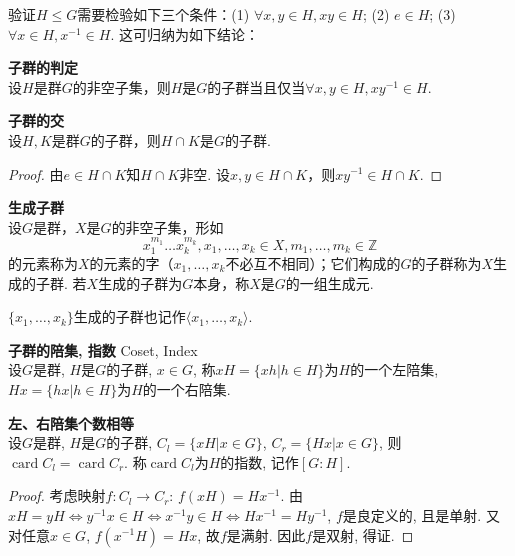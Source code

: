 验证$H\le G$需要检验如下三个条件：(1) $\forall x,y\in H, xy \in H$; (2) $e\in H$; (3) $\forall x\in H, x^{-1} \in H$. 这可归纳为如下结论：

\begin{pro}
\textbf{子群的判定}\\
设$H$是群$G$的非空子集，则$H$是$G$的子群当且仅当$\forall x,y \in H, xy^{-1} \in H$.
\end{pro}

\begin{pro}
\textbf{子群的交}\\
设$H, K$是群$G$的子群，则$H\cap K$是$G$的子群.
\end{pro}
\begin{proof}
    由$e\in H\cap K$知$H\cap K$非空. 设$x,y\in H\cap K$，则$xy^{-1}\in H\cap K$.
\end{proof}

\begin{dfn} \textbf{生成子群}\\
设$G$是群，$X$是$G$的非空子集，形如\begin{equation}
    x_1^{m_1}\dots x_k^{m_k}, x_1,\dots,x_k\in X, m_1,\dots,m_k\in \mathbb{Z}
\end{equation}
的元素称为$X$的元素的字（$x_1,\dots,x_k$不必互不相同）；它们构成的$G$的子群称为$X$生成的子群. 若$X$生成的子群为$G$本身，称$X$是$G$的一组生成元.
\end{dfn}
$\{x_1,\dots,x_k\}$生成的子群也记作$\langle x_1,\dots,x_k \rangle$.

\begin{dfn} \textbf{子群的陪集, 指数} Coset, Index\\
设$G$是群, $H$是$G$的子群, $x\in G$, 称$xH=\{xh\vert h \in H\}$为$H$的一个左陪集, $Hx=\{hx\vert h \in H\}$为$H$的一个右陪集. 
\end{dfn}

\begin{pro} \textbf{左、右陪集个数相等}\\
设$G$是群, $H$是$G$的子群, $C_l = \{xH\vert x\in G\}$, $C_r = \{Hx\vert x\in G\}$, 则 $\operatorname{card} C_l = \operatorname{card} C_r$. 称$\operatorname{card} C_l$为$H$的指数, 记作$[G:H]$. 
\end{pro}
\begin{proof}
考虑映射$f: C_l \to C_r$: $f(xH)=Hx^{-1}$. 由 $xH=yH \iff y^{-1}x\in H \iff x^{-1}y \in H \iff Hx^{-1}=Hy^{-1}$, $f$是良定义的, 且是单射. 又对任意$x\in G$, $f(x^{-1}H)=Hx$, 故$f$是满射. 因此$f$是双射, 得证. 
\end{proof}

